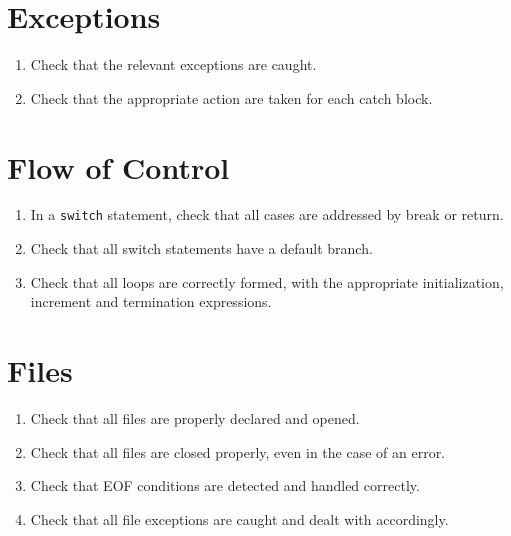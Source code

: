 \section*{Exceptions}\begin{enumerate}[resume]
\item Check that the relevant exceptions are caught.
\item Check that the appropriate action are taken for each catch block.
\end{enumerate}

\section*{Flow of Control}\begin{enumerate}[resume]
\item In a \texttt{switch} statement, check that all cases are addressed by break or return.
\item Check that all switch statements have a default branch.
\item Check that all loops are correctly formed, with the appropriate initialization, increment and termination expressions.
\end{enumerate}

\section*{Files}\begin{enumerate}[resume]
\item Check that all files are properly declared and opened.
\item Check that all files are closed properly, even in the case of an error.
\item Check that EOF conditions are detected and handled correctly.
\item Check that all file exceptions are caught and dealt with accordingly.
\end{enumerate}


